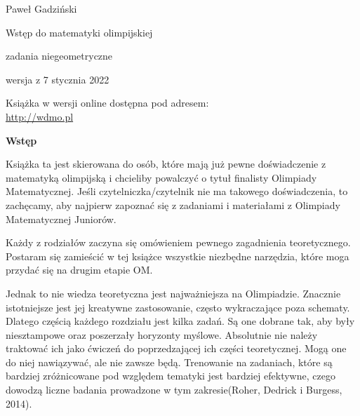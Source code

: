 \thispagestyle{empty}\addtocounter{page}{-1}
	\begin{center}
		\fontsize{15}{15}\selectfont
		Paweł Gadziński

		\vspace{50px}

		\fontsize{40}{40}\selectfont
		\textcolor{kolor}{Wstęp do matematyki olimpijskiej}

		\vspace{20px}

		\fontsize{25}{25}\selectfont
		\textcolor{kolor}{zadania niegeometryczne}

		\vspace{40px}

		\fontsize{15}{15}\selectfont
		wersja z 7 stycznia 2022
	\end{center}
\vspace*{\fill}
\begin{center}
		\fontsize{15}{15}\selectfont
		Książka w wersji online dostępna pod adresem: \\
		\url{http://wdmo.pl}
\end{center}
\newpage
	\vspace*{\fill}
	\begin{center}
		\fontsize{20}{20}\selectfont
		\textbf{Wstęp}
		\vspace{30px}
	\end{center}
		\noindent
		Książka ta jest skierowana do osób, które mają już pewne doświadczenie z matematyką olimpijską i chcieliby powalczyć o tytuł finalisty Olimpiady Matematycznej. Jeśli czytelniczka/czytelnik nie ma takowego doświadczenia, to zachęcamy, aby najpierw zapoznać się z zadaniami i materiałami z Olimpiady Matematycznej Juniorów.

		\vspace{10px}
		\noindent
		Każdy z rodziałów zaczyna się omówieniem pewnego zagadnienia teoretycznego. Postaram się zamieścić w tej książce wszystkie niezbędne narzędzia, które moga przydać się na drugim etapie OM. 

		\vspace{10px}
		\noindent
		Jednak to nie wiedza teoretyczna jest najważniejsza na Olimpiadzie. Znacznie istotniejsze jest jej kreatywne zastosowanie, często wykraczające poza schematy. Dlatego częścią każdego rozdziału jest kilka zadań. Są one dobrane tak, aby były niesztampowe oraz poszerzały horyzonty myślowe. Absolutnie nie należy traktować ich jako ćwiczeń do poprzedzającej ich części teoretycznej. Mogą one do niej nawiązywać, ale nie zawsze będą. Trenowanie na zadaniach, które są bardziej zróżnicowane pod względem tematyki jest bardziej efektywne, czego dowodzą liczne badania prowadzone w tym zakresie(Roher, Dedrick i Burgess, 2014). 

